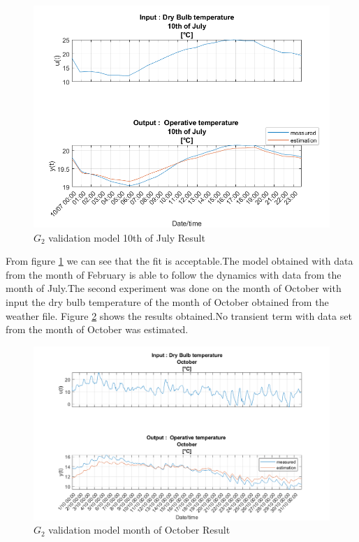 \documentclass[a4paper,12pt]{report}
\numberwithin{equation}{section}
\begin{document}
\begin{figure}[H]
    \includegraphics[width=.8\textwidth]{G2_10_07.png}
    \centering
    \caption{$G_{2}$ validation model 10th of July  Result}
    \label{fig:G2onedayValidation10/07}
\end{figure}

\noindent
From  figure \ref{fig:G2onedayValidation10/07} we can see that the fit is acceptable.The model obtained with data from the month of February is able to follow the dynamics with data from the month of July.The second experiment was  done on the month of October with input the dry bulb temperature of the month of October obtained from the weather file. Figure \ref{fig:G2oneMONTHValidation} shows the results obtained.No transient term with data set from the month of October was estimated.

\begin{figure}[H]
    \includegraphics[width=.9\textwidth]{G2_val_OCT.png}
    \centering
    \caption{$G_{2}$ validation model month of October Result}
    \label{fig:G2oneMONTHValidation}
\end{figure}
\end{document}
